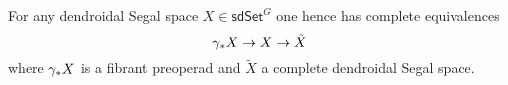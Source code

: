 \documentclass[a4paper,10pt
,draft
]{article}%
\begin{document}
\begin{remark}\label{INTERP REM}
	For any dendroidal Segal space 
	$X \in \mathsf{sdSet}^G$ one hence has complete equivalences
\[
\gamma_{\**} X \to X \to \tilde{X}
\] 
where $\gamma_{\**}X$ is a fibrant preoperad and $\tilde{X}$
a complete dendroidal Segal space.
\end{remark}





%


%
%
\end{document}
